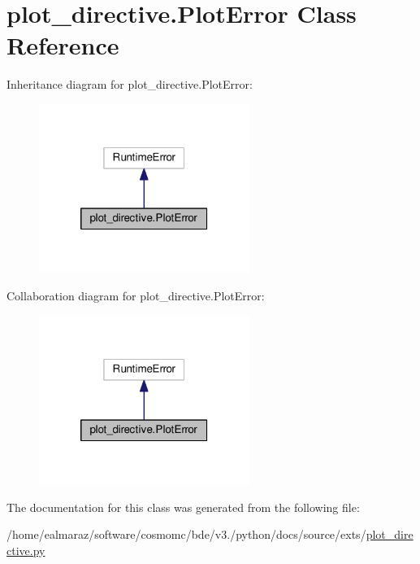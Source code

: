 \hypertarget{classplot__directive_1_1PlotError}{}\section{plot\+\_\+directive.\+Plot\+Error Class Reference}
\label{classplot__directive_1_1PlotError}


Inheritance diagram for plot\+\_\+directive.\+Plot\+Error\+:
\nopagebreak
\begin{figure}[H]
\begin{center}
\leavevmode
\includegraphics[width=194pt]{classplot__directive_1_1PlotError__inherit__graph}
\end{center}
\end{figure}


Collaboration diagram for plot\+\_\+directive.\+Plot\+Error\+:
\nopagebreak
\begin{figure}[H]
\begin{center}
\leavevmode
\includegraphics[width=194pt]{classplot__directive_1_1PlotError__coll__graph}
\end{center}
\end{figure}


The documentation for this class was generated from the following file\+:\begin{DoxyCompactItemize}
\item 
/home/ealmaraz/software/cosmomc/bde/v3./python/docs/source/exts/\mbox{\hyperlink{plot__directive_8py}{plot\+\_\+directive.\+py}}\end{DoxyCompactItemize}
